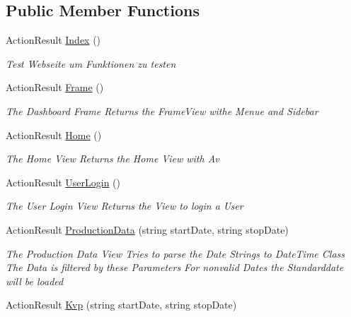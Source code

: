 \subsection*{Public Member Functions}
\begin{DoxyCompactItemize}
\item 
Action\+Result \hyperlink{classkpi_mvc_api_1_1_controllers_1_1_home_controller_a10e3c3151fdc896f23d1ed374bdcd6cf}{Index} ()
\begin{DoxyCompactList}\small\item\em Test Webseite um Funktionen zu testen \end{DoxyCompactList}\item 
Action\+Result \hyperlink{classkpi_mvc_api_1_1_controllers_1_1_home_controller_a8fe51f06ec9db44e1766f89691af44f6}{Frame} ()
\begin{DoxyCompactList}\small\item\em The Dashboard Frame Returns the Frame\+View withe Menue and Sidebar \end{DoxyCompactList}\item 
Action\+Result \hyperlink{classkpi_mvc_api_1_1_controllers_1_1_home_controller_a71cc0c383f8e44677455f0caf590e0a7}{Home} ()
\begin{DoxyCompactList}\small\item\em The Home View Returns the Home View with Av \end{DoxyCompactList}\item 
Action\+Result \hyperlink{classkpi_mvc_api_1_1_controllers_1_1_home_controller_a52ba84d65a16f3ec9f7c18ef46313b23}{User\+Login} ()
\begin{DoxyCompactList}\small\item\em The User Login View Returns the View to login a User \end{DoxyCompactList}\item 
Action\+Result \hyperlink{classkpi_mvc_api_1_1_controllers_1_1_home_controller_ae5c2fcc4413eda2cab2775cd9819efca}{Production\+Data} (string start\+Date, string stop\+Date)
\begin{DoxyCompactList}\small\item\em The Production Data View Tries to parse the Date Strings to Date\+Time Class The Data is filtered by these Parameters For nonvalid Dates the Standarddate will be loaded \end{DoxyCompactList}\item 
Action\+Result \hyperlink{classkpi_mvc_api_1_1_controllers_1_1_home_controller_aab951608121b90d9424bb58c68bd0b23}{Kvp} (string start\+Date, string stop\+Date)

\end{DoxyCompactItemize}
